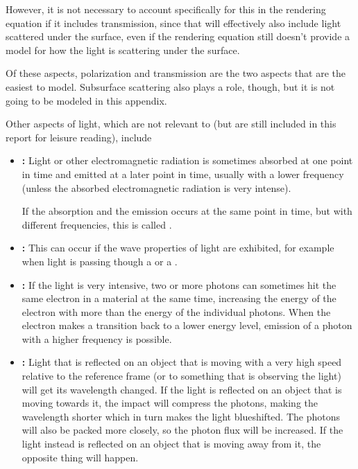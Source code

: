 {\begin{itemize}
However, it is not necessary to account specifically for this in the rendering equation if it includes transmission, since that will effectively also include light scattered under the surface, even if the rendering equation still doesn't provide a model for how the light is scattering under the surface.
\end{itemize}

Of these aspects, polarization and transmission are the two aspects that are the easiest to model. Subsurface scattering also plays a role, though, but it is not going to be modeled in this appendix.

Other aspects of light, which are not relevant to \surfacewaterrendering (but are still included in this report for leisure reading), include

\begin{itemize}
\item \textbf{:} Light or other electromagnetic radiation is sometimes absorbed at one point in time and emitted at a later point in time, usually with a lower frequency (unless the absorbed electromagnetic radiation is very intense).

If the absorption and the emission occurs at the same point in time, but with different frequencies, this is called .
    
\item \textbf{:} This can occur if the wave properties of light are exhibited, for example when light is passing though a  or a .
    
\item \textbf{:} If the light is very intensive, two or more photons can sometimes hit the same electron in a material at the same time, increasing the energy of the electron with more than the energy of the individual photons. When the electron makes a transition back to a lower energy level, emission of a photon with a higher frequency is possible.
    
\item \textbf{:} Light that is reflected on an object that is moving with a very high speed relative to the reference frame (or to something that is observing the light) will get its wavelength changed. If the light is reflected on an object that is moving towards it, the impact will compress the photons, making the wavelength shorter which in turn makes the light blueshifted. The photons will also be packed more closely, so the photon flux will be increased. If the light instead is reflected on an object that is moving away from it, the opposite thing will happen.
\end{itemize}

}
